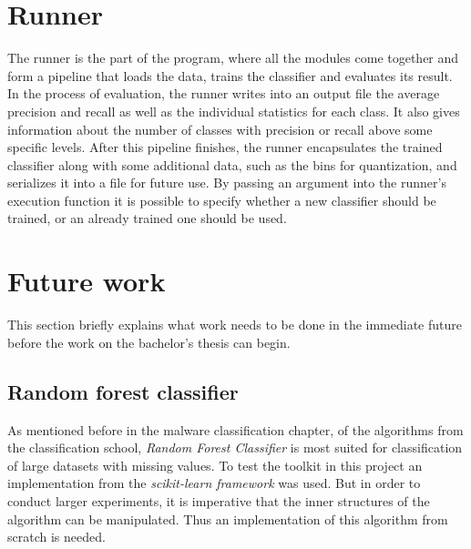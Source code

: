 \documentclass[11pt]{article}
\begin{document}
  \section{Runner}
    The runner is the part of the program, where all the modules come together and form a pipeline that loads the data, trains the classifier and evaluates its result. In the process of evaluation, the runner writes into an output file the average precision and recall as well as the individual statistics for each class. It also gives information about the number of classes with precision or recall above some specific levels. After this pipeline finishes, the runner encapsulates the trained classifier along with some additional data, such as the bins for quantization, and serializes it into a file for future use. By passing an argument into the runner's execution function it is possible to specify whether a new classifier should be trained, or an already trained one should be used.
  \section{Future work}
    This section briefly explains what work needs to be done in the immediate future before the work on the bachelor's thesis can begin.
    \subsection{Random forest classifier}
      As mentioned before in the malware classification chapter, of the algorithms from the classification school, {\it Random Forest Classifier} is most suited for classification of large datasets with missing values\cite{breiman}. To test the toolkit in this project an implementation from the {\it scikit-learn framework}\cite{scikit} was used. But in order to conduct larger experiments, it is imperative that the inner structures of the algorithm can be manipulated. Thus an implementation of this algorithm from scratch is needed.
    \newpage
\end{document}
